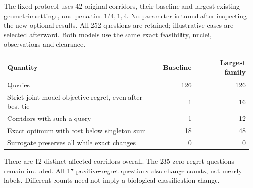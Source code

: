 \documentclass[10pt,letterpaper]{article}
\begin{document}
The fixed protocol uses 42 original corridors, their baseline and largest existing geometric settings, and penalties $1/4,1,4$. No parameter is tuned after inspecting the new optional results. All 252 questions are retained; illustrative cases are selected afterward. Both models use the same exact feasibility, nuclei, observations and clearance.

\begin{center}
\begin{tabular}{lrr}\toprule
Quantity & Baseline & Largest family\\\midrule
Queries &126&126\\
Strict joint-model objective regret, even after best tie &1&16\\
Corridors with such a query &1&12\\
Exact optimum with cost below singleton sum &18&48\\
Surrogate preserves all while exact changes &0&0\\\bottomrule
\end{tabular}
\end{center}
There are 12 distinct affected corridors overall. The 235 zero-regret questions remain included. All 17 positive-regret questions also change counts, not merely labels. Different counts need not imply a biological classification change.
\end{document}
